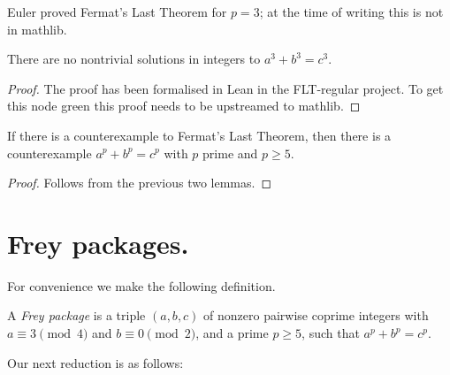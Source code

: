 Euler proved Fermat's Last Theorem for $p=3$; at the time of writing this is not in mathlib.

\begin{lemma}\label{p_not_three}\leanok
  There are no nontrivial solutions in integers to $a^3+b^3=c^3$.
\end{lemma}
\begin{proof}
  The proof has been formalised in Lean in the FLT-regular project. To get this node green
  this proof needs to be upstreamed to mathlib.
\end{proof}

\begin{corollary}\label{WLOG_p_ge_5}\leanok If there is a counterexample to Fermat's Last Theorem,
  then there is a counterexample $a^p+b^p=c^p$ with $p$ prime and $p\geq 5$.
\end{corollary}
\begin{proof}\leanok Follows from the previous two lemmas.\end{proof}

\section{Frey packages.}

For convenience we make the following definition.

\begin{definition}\label{Frey_package}\leanok A \emph{Frey package} is a triple $(a,b,c)$ of nonzero pairwise coprime integers with $a\equiv3\pmod4$ and $b\equiv0\pmod2$, and a prime $p\geq5$, such that $a^p+b^p=c^p$.\end{definition}

Our next reduction is as follows:

